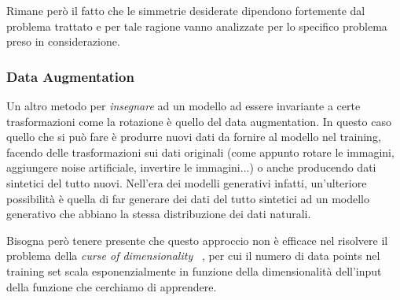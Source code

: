 Rimane però il fatto che le simmetrie desiderate dipendono fortemente 
dal problema trattato e per tale ragione vanno analizzate per lo 
specifico problema preso in considerazione.


\subsubsection{Data Augmentation}
Un altro metodo per \textit{insegnare} ad un modello ad essere invariante
a certe trasformazioni come la rotazione è quello del data augmentation.
In questo caso quello che si può fare è produrre nuovi dati da fornire
al modello nel training, facendo delle trasformazioni sui dati 
originali (come appunto rotare le immagini, aggiungere noise artificiale,
invertire le immagini...) o anche producendo dati sintetici del tutto
nuovi. Nell'era dei modelli generativi infatti, un'ulteriore possibilità
è quella di far generare dei dati del tutto sintetici ad un modello 
generativo che abbiano la stessa distribuzione dei dati naturali.

Bisogna però tenere presente che questo approccio non è efficace nel 
risolvere il problema della \textit{curse of dimensionality}
~\cite{bellman1957dynamic, Hughes1968OnTM, bronstein2021geometric}, 
per cui il numero di data points nel training set scala esponenzialmente 
in funzione della dimensionalità dell'input della funzione che 
cerchiamo di apprendere.
